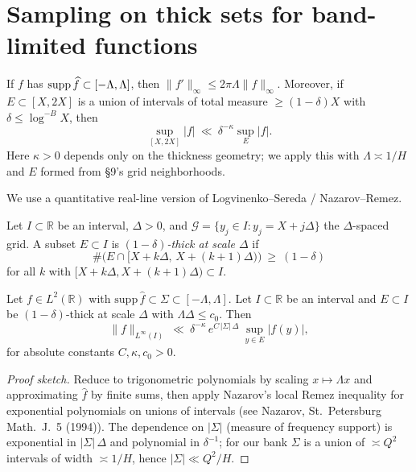 
\section{Sampling on thick sets for band-limited functions}\label{app:ls}\label{sec:nolonggap}

If $f$ has $\operatorname{supp}\widehat f\subset[-\Lambda,\Lambda]$, then $\|f'\|_\infty\le 2\pi\Lambda \|f\|_\infty$. Moreover, if $E\subset [X,2X]$ is a union of intervals of total measure $\ge (1-\delta)X$ with $\delta\le \log^{-B}X$, then
\[
\sup_{[X,2X]}|f|\ \ll\ \delta^{-\kappa}\sup_E |f|.
\]
Here $\kappa>0$ depends only on the thickness geometry; we apply this with $\Lambda\asymp 1/H$ and $E$ formed from \S9’s grid neighborhoods.


We use a quantitative real-line version of Logvinenko–Sereda / Nazarov--Remez.

\begin{definition}
Let $I\subset\mathbb R$ be an interval, $\Delta>0$, and $\mathcal G=\{y_j\in I: y_j=X+j\Delta\}$ the $\Delta$-spaced grid.
A subset $E\subset I$ is \emph{$(1-\delta)$-thick at scale $\Delta$} if
\[
\#\bigl(E\cap [X+k\Delta,\,X+(k+1)\Delta)\bigr)\ \ge\ (1-\delta)
\]
for all $k$ with $[X+k\Delta,X+(k+1)\Delta)\subset I$.
\end{definition}

\begin{theorem}\label{thm:LS}
Let $f\in L^2(\mathbb R)$ with $\mathrm{supp}\,\widehat f\subset \Sigma\subset[-\Lambda,\Lambda]$.
Let $I\subset\mathbb R$ be an interval and $E\subset I$ be $(1-\delta)$-thick at scale $\Delta$ with $\Lambda\Delta\le c_0$.
Then
\[
\|f\|_{L^\infty(I)}\ \ll\ \delta^{-\kappa}\,e^{C\,|\Sigma|\,\Delta}\ \sup_{y\in E}|f(y)|,
\]
for absolute constants $C,\kappa,c_0>0$.
\end{theorem}

\begin{proof}[Proof sketch]
Reduce to trigonometric polynomials by scaling $x\mapsto \Lambda x$ and approximating $\widehat f$ by finite sums, then apply Nazarov’s local Remez inequality for exponential polynomials on unions of intervals (see Nazarov, St.\ Petersburg Math.\ J.\ 5 (1994)). The dependence on $|\Sigma|$ (measure of frequency support) is exponential in $|\Sigma|\,\Delta$ and polynomial in $\delta^{-1}$; for our bank $\Sigma$ is a union of $\asymp Q^2$ intervals of width $\asymp 1/H$, hence $|\Sigma|\ll Q^2/H$.
\end{proof}

